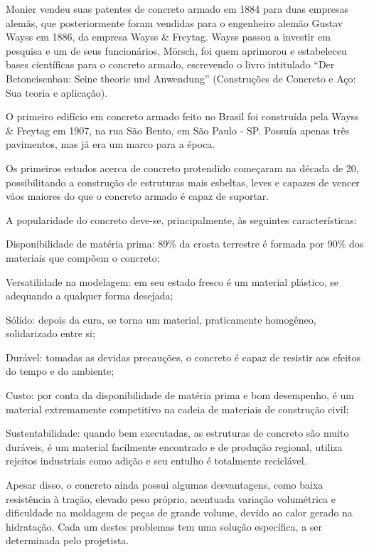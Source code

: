 Monier vendeu suas patentes de concreto armado em 1884 para duas empresas alemãs, que posteriormente foram vendidas para o engenheiro alemão Gustav Wayss em 1886, da empresa Wayss \& Freytag. Wayss passou a investir em pesquisa e um de seus funcionários, Mörsch, foi quem aprimorou e estabeleceu bases científicas para o concreto armado, escrevendo o livro intitulado ``Der Betoneisenbau: Seine theorie und Anwendung'' (Construções de Concreto e Aço: Sua teoria e aplicação).

O primeiro edifício em concreto armado feito no Brasil foi construída pela Wayss \& Freytag em 1907, na rua São Bento, em São Paulo - SP. Possuía apenas três pavimentos, mas já era um marco para a época.

Os primeiros estudos acerca de concreto protendido começaram na década de 20, possibilitando a construção de estruturas mais esbeltas, leves e capazes de vencer vãos maiores do que o concreto armado é capaz de suportar.

A popularidade do concreto deve-se, principalmente, às seguintes características:

\begin{alineas}[label=\textbullet]
  \item Disponibilidade de matéria prima: 89\% da crosta terrestre é formada por 90\% dos materiais que compõem o concreto;
  \item Versatilidade na modelagem: em seu estado fresco é um material plástico, se adequando a qualquer forma desejada;
  \item Sólido: depois da cura, se torna um material, praticamente homogêneo, solidarizado entre si;
  \item Durável: tomadas as devidas precauções, o concreto é capaz de resistir aos efeitos do tempo e do ambiente;
  \item Custo: por conta da disponibilidade de matéria prima e bom desempenho, é um material extremamente competitivo na cadeia de materiais de construção civil;
  \item Sustentabilidade: quando bem executadas, as estruturas de concreto são muito duráveis, é um material facilmente encontrado e de produção regional, utiliza rejeitos industriais como adição e seu entulho é totalmente reciclável.
\end{alineas}

Apesar disso, o concreto ainda possui algumas desvantagens, como baixa resistência à tração, elevado peso próprio, acentuada variação volumétrica e dificuldade na moldagem de peças de grande volume, devido ao calor gerado na hidratação. Cada um destes problemas tem uma solução específica, a ser determinada pelo projetista.

